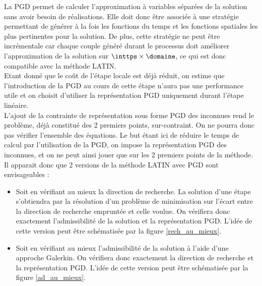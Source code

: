 La PGD permet de calculer l'approximation à variables séparées de la solution sans avoir besoin de réalisations. Elle doit donc être associée à une stratégie permettant de générer à la fois les fonctions du temps et les fonctions spatiales les plus pertinentes pour la solution. De plus, cette stratégie ne peut être incrémentale car chaque couple généré durant le processus doit améliorer l'approximation de la solution sur $\inttps \times \domaine$, ce qui est donc compatible avec la méthode LATIN.\\

Etant donné que le coût de l'étape locale est déjà réduit, on estime que l'introduction de la PGD au cours de cette étape n'aura pas une performance utile et on choisit d'utiliser la représentation PGD uniquement durant l'étape linéaire.\\

L'ajout de la contrainte de représentation sous forme PGD des inconnues rend le problème, déjà constitué des 2 premiers points, sur-contraint. On ne pourra donc pas vérifier l'ensemble des équations. Le but étant ici de réduire le temps de calcul par l'utilisation de la PGD, on impose la représentation PGD des inconnues, et on ne peut ainsi jouer que sur les 2 premiers points de la méthode. Il apparait donc que 2 versions de la méthode LATIN avec PGD sont envisageables :\\

\begin{itemize}
\item Soit en vérifiant \og au mieux\fg{} la direction de recherche. La solution d'une étape s'obtiendra par la résolution d'un problème de minimisation sur l'écart entre la direction de recherche empruntée et celle voulue. On vérifiera donc exactement l'admissibilité de la solution et la représentation PGD. L'idée de cette version peut être schématisée par la figure \ref{rech_au_mieux}.\\
\item Soit en vérifiant \og au mieux\fg{} l'admissibilité de la solution à l'aide d'une approche Galerkin. On vérifiera donc exactement la direction de recherche et la représentation PGD. L'idée de cette version peut être schématisée par la figure \ref{ad_au_mieux}.\\
\end{itemize}
 
 
 
